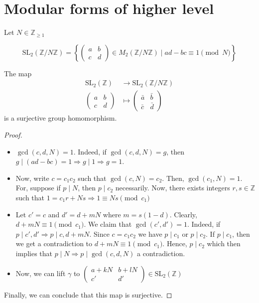 \documentclass[oneside, 12pt]{scrbook}
\newcommand{\ZZ}{\mathbb Z}
\newcommand{\SL}{\mathrm{SL}}
\theoremstyle{theorem}
\begin{document}
\section{Modular forms of higher level}

Let $N \in \ZZ_{\geq 1}$ 

$$\mathrm{SL}_{2}(\ZZ / N \ZZ) =\left\{ \begin{pmatrix}
a & b \\ c & d
\end{pmatrix} \in M_{2}(\ZZ / N \ZZ) \mid ad-bc \equiv 1 \pmod{N} \right\}$$

\begin{lemma}[DS, Exercise 1.2.2]
The map 
\begin{align*}
\mathrm{SL}_{2}(\ZZ) &\rightarrow \mathrm{SL}_{2}(\ZZ / N \ZZ) \\
\begin{pmatrix}
a & b \\ c & d
\end{pmatrix}  &\mapsto \begin{pmatrix}
\bar{a} & \bar{b} \\ \bar{c} & \bar{d}
\end{pmatrix}
\end{align*}
is a surjective group homomorphism.
\end{lemma}

\begin{proof}
\begin{itemize}
\item $\gcd(c,d,N)=1$. Indeed, if $\gcd(c,d,N)=g$, then $g \mid (ad-bc) =1\Rightarrow g\mid 1 \Rightarrow g =1$. 
\item Now, write $c=c_{1}c_{2}$ such that $\gcd(c,N)=c_{2}$. Then, $\gcd(c_{1},N)=1$. For, suppose if $p \mid N $, then $p \mid c_{2}$ necessarily. Now, there exists integers $r,s \in  \ZZ$ such that $1= c_{1}r + Ns \Rightarrow 1 \equiv Ns \pmod{c_{1}}$
\item Let $c'=c$ and $d'=d+mN$ where $m=s(1-d)$. Clearly, $d +mN \equiv 1\pmod{c_{1}} $. We claim that $\gcd(c',d')=1$. Indeed, if $p \mid c' , d' \Rightarrow p \mid c,d+mN$. Since $c=c_{1}c_{2}$ we have $p \mid c_{1}$ or $p \mid c_{2}$. If $p \mid c_{1}$, then we get a contradiction to $d + mN \equiv 1 \pmod{c_{1}}$. Hence, $p \mid c_{2}$ which then implies that $p \mid N \Rightarrow p \mid \gcd(c,d,N)$ a contradiction. 
\item Now, we can lift $\gamma$ to $\begin{pmatrix}
a + kN & b + l N \\
c' & d'
\end{pmatrix} \in \SL_{2}(\ZZ)$
\end{itemize}
Finally, we can conclude that this map is surjective.
\end{proof}
\end{document}

